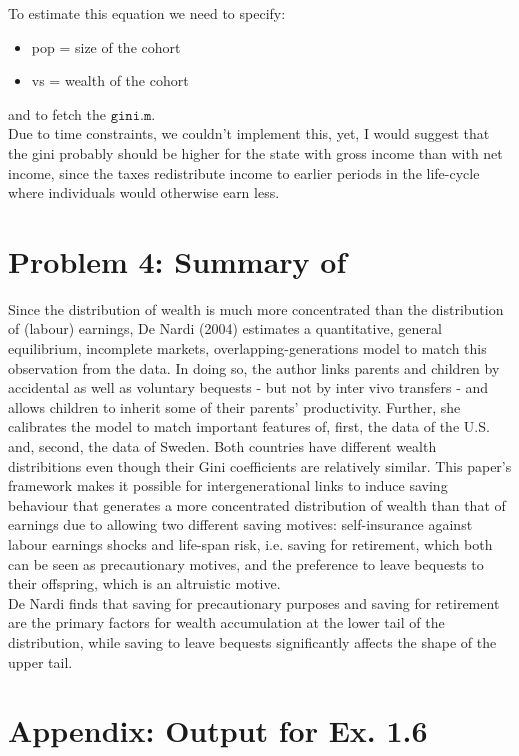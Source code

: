 \documentclass[12pt,a4paper]{article}
\begin{document}
To estimate this equation we need to specify:
\begin{itemize}
\item pop = size of the cohort
\item vs = wealth of the cohort
\end{itemize}
and to fetch the $\texttt{gini.m}$. \\
Due to time constraints, we couldn't implement this, yet, I would suggest that the gini probably should be higher for the state with gross income than with net income, since the taxes redistribute income to earlier periods in the life-cycle where individuals would otherwise earn less. 

\section*{Problem 4: Summary of \cite{de2004wealth}}
Since the distribution of wealth is much more concentrated than the distribution of (labour) earnings, De Nardi (2004) estimates a quantitative, general equilibrium, incomplete markets, overlapping-generations model to match this observation from the data. In doing so, the author links parents and children by accidental as well as voluntary bequests - but not by inter vivo transfers - and allows children to inherit some of their parents' productivity. Further, she calibrates the model to match important features of, first, the data of the U.S. and, second, the data of Sweden. Both countries have different wealth distribitions even though their Gini coefficients are relatively similar. This paper's framework makes it possible for intergenerational links to induce saving behaviour that generates a more concentrated distribution of wealth than that of earnings due to allowing two different saving motives: self-insurance against labour earnings shocks and life-span risk, i.e. saving for retirement, which both can be seen as precautionary motives, and the preference to leave bequests to their offspring, which is an altruistic motive.
\\
De Nardi finds that saving for precautionary purposes and saving for retirement are the primary factors for wealth accumulation at the lower tail of the distribution, while saving to leave bequests significantly affects the shape of the upper tail.

\pagebreak



\pagebreak

\section*{Appendix: Output for Ex. 1.6}


\end{document}
